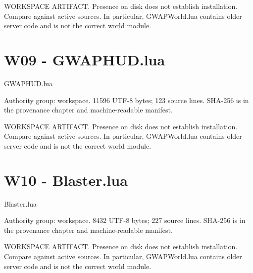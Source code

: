 WORKSPACE ARTIFACT.\allowbreak{} Presence on disk does not establish installation.\allowbreak{} Compare against active sources.\allowbreak{} In particular, GWAPWorld.\allowbreak{}lua contains older server code and is not the correct world module.\allowbreak{}

\begingroup{}
\endgroup
\chapter{W09 - GWAPHUD.\allowbreak{}lua}
\label{src:W09}
GWAPHUD.\allowbreak{}lua

Authority group: workspace.\allowbreak{} 11596 UTF-8 bytes; 123 source lines.\allowbreak{} SHA-256 is in the provenance chapter and machine-readable manifest.\allowbreak{}

WORKSPACE ARTIFACT.\allowbreak{} Presence on disk does not establish installation.\allowbreak{} Compare against active sources.\allowbreak{} In particular, GWAPWorld.\allowbreak{}lua contains older server code and is not the correct world module.\allowbreak{}

\begingroup{}
\endgroup
\chapter{W10 - Blaster.\allowbreak{}lua}
\label{src:W10}
Blaster.\allowbreak{}lua

Authority group: workspace.\allowbreak{} 8432 UTF-8 bytes; 227 source lines.\allowbreak{} SHA-256 is in the provenance chapter and machine-readable manifest.\allowbreak{}

WORKSPACE ARTIFACT.\allowbreak{} Presence on disk does not establish installation.\allowbreak{} Compare against active sources.\allowbreak{} In particular, GWAPWorld.\allowbreak{}lua contains older server code and is not the correct world module.\allowbreak{}

\begingroup{}
\endgroup
